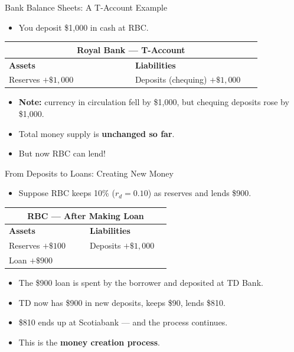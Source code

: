 \documentclass[aspectratio=169]{beamer}
\begin{document}
\begin{frame}{Bank Balance Sheets: A T-Account Example}
\transfade
\begin{itemize}
  \item You deposit \alert{\$1{,}000} in cash at RBC.
\end{itemize}
\vspace{0.3em}
\begin{center}
\begin{tabular}{p{0.45\linewidth} p{0.45\linewidth}}
\toprule
\multicolumn{2}{c}{\textbf{Royal Bank --- T-Account}} \\
\midrule
\textbf{Assets} & \textbf{Liabilities} \\
\midrule
Reserves $+\$1{,}000$ & Deposits (chequing) $+\$1{,}000$ \\
\bottomrule
\end{tabular}
\end{center}
\vspace{0.5em}
\begin{itemize}
  \item \textbf{Note:} currency in circulation fell by \$1{,}000, but chequing deposits rose by \$1{,}000.
  \item Total money supply is \textbf{unchanged so far}.
  \item But now RBC can lend!
\end{itemize}
\end{frame}

\begin{frame}{From Deposits to Loans: Creating New Money}
\transfade
\begin{itemize}
  \item Suppose RBC keeps 10\% ($r_d = 0.10$) as reserves and lends \alert{\$900}.
\end{itemize}
\begin{center}
\small
\begin{tabular}{p{0.45\linewidth} p{0.45\linewidth}}
\toprule
\multicolumn{2}{c}{\textbf{RBC --- After Making Loan}} \\
\midrule
\textbf{Assets} & \textbf{Liabilities} \\
\midrule
Reserves $+\$100$ & Deposits $+\$1{,}000$ \\
Loan $+\$900$ & \\
\bottomrule
\end{tabular}
\end{center}
\vspace{0.4em}
\begin{itemize}
  \item The \$900 loan is spent by the borrower and deposited at TD Bank.
  \item TD now has \$900 in new deposits, keeps \$90, lends \$810.
  \item \$810 ends up at Scotiabank --- and the process continues.
  \item This is the \textbf{money creation process}.
\end{itemize}
\end{frame}
\end{document}
